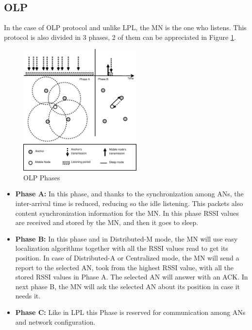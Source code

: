 \subsection{\acl{OLP}}

In the case of \ac{OLP} protocol and unlike \ac{LPL}, the \ac{MN} is the one who listens. This protocol is also divided in 3 phases, 2 of 
them can be appreciated in Figure \ref{fig:OLP}.

\begin{figure}[ht]
 \begin{center}
  \includegraphics[width=0.55\textwidth]{OLP.eps}
 \end{center}
 \caption{OLP Phases \cite{LPLandOLP}}
 \label{fig:OLP}
\end{figure}

\begin{itemize}
 \item \textbf{Phase A:} In this phase, and thanks to the synchronization among \acp{AN}, the inter-arrival time is reduced, reducing so the
idle listening. This packets also content synchronization information for the \ac{MN}. In this phase \ac{RSSI} values are received and stored
by the \ac{MN}, and then it goes to sleep.
 \item \textbf{Phase B:} In this phase and in Distributed-M mode, the \ac{MN} will use easy localization algorithms together with all the \ac{RSSI}
values read to get its position. In case of Distributed-A or Centralized mode, the \ac{MN} will send a report to the selected \ac{AN}, took 
from the highest \ac{RSSI} value, with all the stored \ac{RSSI} values in Phase A. The selected \ac{AN} will answer with an \ac{ACK}. In next
phase B, the \ac{MN} will ask the selected \ac{AN} about its position in case it needs it.
 \item \textbf{Phase C:} Like in \ac{LPL} this Phase is reserved for communication among \acp{AN} and network configuration.
\end{itemize}

